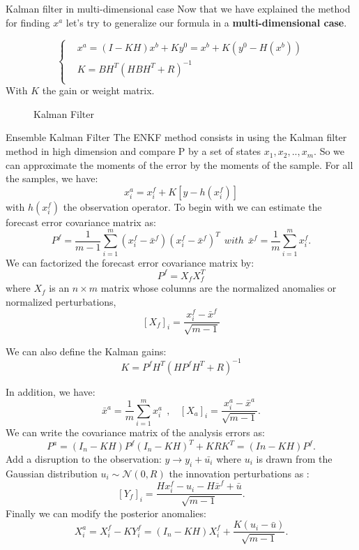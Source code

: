 \begin{frame}{Kalman filter in multi-dimensional case}
   Now that we have explained the method for finding $x^a$ let's try to generalize our formula in a \textbf{multi-dimensional case}.

   $$\left\{\begin{aligned}
     &x^a=(I-KH)x^b+Ky^0=x^b+K(y^0-H(x^b)) \\
           &K=BH^T(HBH^T+R)^{-1} \\
    \end{aligned}\right.$$
   With $K$ the gain or weight matrix.
   \begin{figure}[H]
       \caption{Kalman Filter}
   \end{figure}
\end{frame}
\begin{frame}[allowframebreaks]{Ensemble Kalman Filter}
   \noindent The ENKF method consists in using the Kalman filter method in high dimension and compare P by a set of states $x_1,x_2,..,x_{m}$. So we can approximate the moments of the error by the moments of the sample.
For all the samples, we have:
$$x_i^a=x_i^f+K[y-h(x_i^f)]$$
with $h(x_i^f)$ the observation operator.
\newline \noindent To begin with we can estimate the
forecast error covariance matrix as:
$$P^f=\frac{1}{m-1}\sum_{i=1}^{m}(x_i^f-\bar{x}^f)(x_i^f-\bar{x}^f)^T~~with~~\bar{x}^f=\frac{1}{m}\sum_{i=1}^{m}x_i^f .$$ 
\noindent We can factorized the forecast error covariance matrix by:
$$P^f=X_f X_f^T$$
where $X_f$ is an $n \times m$ matrix whose columns are the normalized anomalies or normalized perturbations,
$$[X_f]_i=\frac{x_i^f-\bar{x}^f}{\sqrt{m-1}}$$

\noindent We can also define the Kalman gains: 
$$K=P^f H^T(HP^f H^T+R)^{-1}$$

\noindent In addition, we have:
$$
\bar{x}^a=\frac{1}{m}\sum_{i=1}^mx_i^a~~,~~~~[X_a]_i=\frac{x_i^a-\bar{x}^a}{\sqrt{m-1}}. $$
\newline \noindent We can write the covariance matrix of the analysis errors as:
$$P^a=(I_n-KH)P^f(I_n-KH)^T+KRK^T=(In-KH)P^f.$$
\noindent Add a disruption to the observation: $y\rightarrow y_i+\bar{u_i}$ where $u_i$ is drawn from the Gaussian distribution $u_i \sim \mathcal{N}(0,R)$
\newline the innovation perturbations as :
$$[Y_f]_i=\frac{Hx_i^f-u_i-H\bar{x}^f+\bar{u}}{\sqrt{m-1}}.$$
\noindent Finally we can modify the posterior anomalies:
$$X_i^a=X_i^f-KY_i^f=(I_n-KH)X_i^f+\frac{K(u_i-\bar{u})}{\sqrt{m-1}}.$$
\end{frame}
